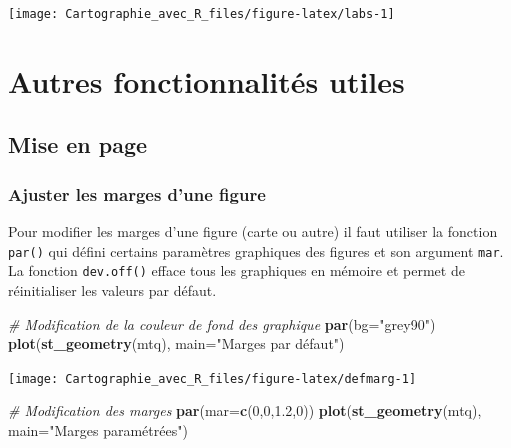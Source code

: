 \documentclass[]{book}
\newenvironment{Shaded}{\begin{snugshade}}{\end{snugshade}}
\newcommand{\KeywordTok}[1]{\textcolor[rgb]{0.13,0.29,0.53}{\textbf{#1}}}
\newcommand{\DataTypeTok}[1]{\textcolor[rgb]{0.13,0.29,0.53}{#1}}
\newcommand{\DecValTok}[1]{\textcolor[rgb]{0.00,0.00,0.81}{#1}}
\newcommand{\FloatTok}[1]{\textcolor[rgb]{0.00,0.00,0.81}{#1}}
\newcommand{\StringTok}[1]{\textcolor[rgb]{0.31,0.60,0.02}{#1}}
\newcommand{\CommentTok}[1]{\textcolor[rgb]{0.56,0.35,0.01}{\textit{#1}}}
\newcommand{\NormalTok}[1]{#1}
\begin{document}
\begin{center}\texttt{[image: Cartographie\_avec\_R\_files/figure-latex/labs-1]} \end{center}

\section{Autres fonctionnalités
utiles}\label{autres-fonctionnalites-utiles}

\subsection{Mise en page}\label{mise-en-page}

\subsubsection{Ajuster les marges d'une
figure}\label{ajuster-les-marges-dune-figure}

Pour modifier les marges d'une figure (carte ou autre) il faut utiliser
la fonction \texttt{par()} qui défini certains paramètres graphiques des
figures et son argument \texttt{mar}. La fonction \texttt{dev.off()}
efface tous les graphiques en mémoire et permet de réinitialiser les
valeurs par défaut.

\begin{Shaded}
\begin{Highlighting}[]
\CommentTok{# Modification de la couleur de fond des graphique}
\KeywordTok{par}\NormalTok{(}\DataTypeTok{bg=}\StringTok{"grey90"}\NormalTok{)}
\KeywordTok{plot}\NormalTok{(}\KeywordTok{st_geometry}\NormalTok{(mtq), }\DataTypeTok{main=}\StringTok{"Marges par défaut"}\NormalTok{)}
\end{Highlighting}
\end{Shaded}

\begin{center}\texttt{[image: Cartographie\_avec\_R\_files/figure-latex/defmarg-1]} \end{center}

\begin{Shaded}
\begin{Highlighting}[]
\CommentTok{# Modification des marges}
\KeywordTok{par}\NormalTok{(}\DataTypeTok{mar=}\KeywordTok{c}\NormalTok{(}\DecValTok{0}\NormalTok{,}\DecValTok{0}\NormalTok{,}\FloatTok{1.2}\NormalTok{,}\DecValTok{0}\NormalTok{))}
\KeywordTok{plot}\NormalTok{(}\KeywordTok{st_geometry}\NormalTok{(mtq), }\DataTypeTok{main=}\StringTok{"Marges paramétrées"}\NormalTok{)}
\end{Highlighting}
\end{Shaded}
\end{document}

